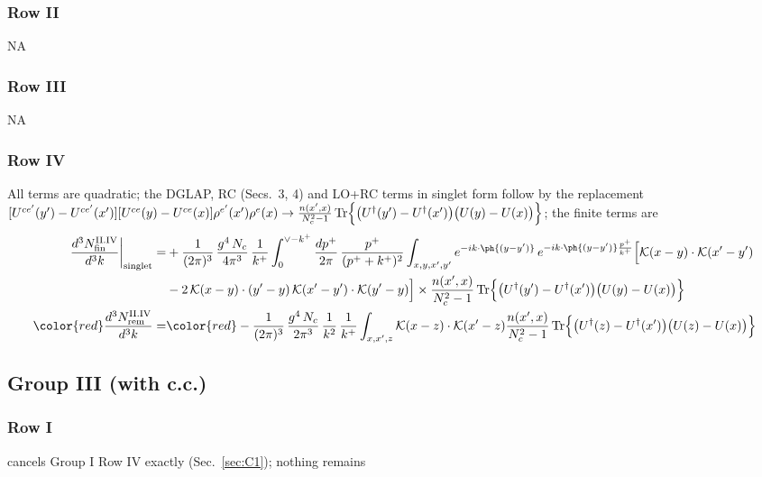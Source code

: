 \subsubsection*{Row II}
\textsc{NA}
\subsubsection*{Row III}
\textsc{NA}
\subsubsection*{Row IV}
All terms are quadratic; the DGLAP, RC (Secs.~3, 4) and LO+RC terms in singlet form follow by the replacement $[U^{ce'}(y')-U^{ce'}(x')][U^{ce}(y)-U^{ce}(x)]\rho^{e'}(x')\rho^{e}(x)\to\frac{n(x',x)}{N_{c}^{2}-1}\,{\rm Tr}\Big\{\big(U^{\dagger}(y')-U^{\dagger}(x')\big)\big(U(y)-U(x)\big)\Big\}$; the finite terms are
\begin{align}
\frac{d^{3}N^{\rm II.IV}_{\rm fin}}{d^{3}k}\bigg|_{\rm singlet}= &  +\frac{1}{(2\pi)^{3}}\,\frac{g^{4}\,N_{c}}{4\pi^{3}}\,\frac{1}{k^{+}}\int_{0}^{\vee-k^{+}}\frac{dp^{+}}{2\pi}\,\frac{p^{+}}{(p^{+}+k^{+})^{2}}\int_{x,y,x',y'}e^{-ik\cdot\ph{(y-y')}}\,e^{-ik\cdot\ph{(y-y')}\frac{p^{+}}{k^{+}}}\Big[\mathcal{K}(x-y)\cdot\mathcal{K}(x'-y')\notag \\ & -2\,\mathcal{K}(x-y)\cdot(y'-y)\,\mathcal{K}(x'-y')\cdot\mathcal{K}(y'-y)\Big]\times\frac{n(x',x)}{N_{c}^{2}-1}\,{\rm Tr}\Big\{\big(U^{\dagger}(y')-U^{\dagger}(x')\big)\big(U(y)-U(x)\big)\Big\}\label{eq:E-II.IV}\\
{\color{red}\frac{d^{3}N^{\rm II.IV}_{\rm rem}}{d^{3}k}}=&{\color{red}-\frac{1}{(2\pi)^{3}}\,\frac{g^{4}\,N_{c}}{2\pi^{3}}\,\frac{1}{k^{2}}\,\frac{1}{k^{+}}\int_{x,x',z}\mathcal{K}(x-z)\cdot\mathcal{K}(x'-z)\frac{n(x',x)}{N_{c}^{2}-1}\,{\rm Tr}\Big\{\big(U^{\dagger}(z)-U^{\dagger}(x')\big)\big(U(z)-U(x)\big)\Big\}}\label{eq:E-II.IVrem}
\end{align}
\subsection{Group III (with c.c.)}
\subsubsection*{Row I}
cancels Group I Row IV exactly (Sec.~\ref{sec:C1}); nothing remains
